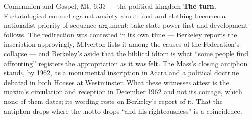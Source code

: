 \begin{afterlife}{Communion and Gospel, Mt. 6:33 --- the political kingdom}
\textbf{The turn.} Eschatological counsel against anxiety about food and
clothing becomes a nationalist priority-of-sequence argument: take state power
first and development follows. The redirection was contested in its own time ---
Berkeley reports the inscription approvingly, Milverton lists it among the
causes of the Federation's collapse --- and Berkeley's aside that the biblical
idiom is what ``some people find affronting'' registers the appropriation as it
was felt. The Mass's closing antiphon stands, by 1962, as a monumental
inscription in Accra and a political doctrine debated in both Houses at
Westminster. What these witnesses attest is the maxim's circulation and
reception in December 1962 and not its coinage, which none of them dates; its
wording rests on Berkeley's report of it. That the antiphon drops  where the motto drops
``and his righteousness'' is a coincidence.
\end{afterlife}

